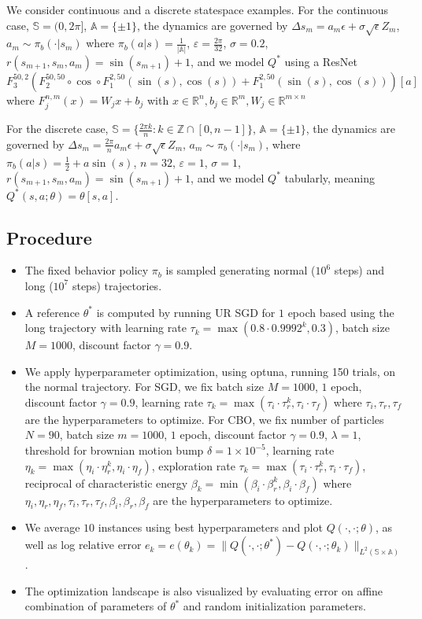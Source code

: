 \documentclass[10.5pt]{article}
\newcommand\bb{\mathbb}
\begin{document}
We consider continuous and a discrete statespace examples. For the continuous case, $\bb S = (0, 2\pi]$, $\bb A = \{\pm 1\}$, the dynamics are governed by $\Delta s_{m} = a_m\epsilon + \sigma \sqrt{\epsilon} Z_m$, $a_m\sim \pi_b(\cdot|s_m)$
  where $\pi_b(a|s)=\tfrac{1}{|\mathbb A|}$, $\varepsilon = \tfrac{2\pi}{32}$, $\sigma = 0.2$, $r(s_{m+1},s_{m},a_m) = \sin(s_{m+1})+1$, and we model $Q^*$ using a ResNet
$$
F_3^{50,2}\left(F_2^{50,50}\circ \cos\circ F_1^{2,50}(\sin(s),\cos(s)) + F_1^{2,50}(\sin(s),\cos(s))\right)[a]
$$
where $F_j^{n,m}(x)=W_j x + b_j$ with $x\in \bb R^n, b_j\in \bb R^m, W_j\in \bb R^{m\times n}$

For the discrete case, $\bb S = \{\tfrac{2\pi k }{n}: k\in \mathbb Z \cap [0,n-1]\}$, $\bb A = \{\pm 1\}$, the dynamics are governed by $\Delta s_{m} = \tfrac{2\pi}{n}a_m\epsilon + \sigma \sqrt{\epsilon} Z_m$, $a_m\sim \pi_b(\cdot|s_m)$, where $\pi_b(a|s)=\tfrac{1}{2}+ a\sin(s)$, $n=32$, $\varepsilon=1$, $\sigma=1$, $r(s_{m+1},s_{m},a_m) = \sin(s_{m+1})+1$, and we model $Q^*$ tabularly, meaning $Q^*(s,a;\theta)= \theta[s,a]$.

\subsection{Procedure}
\begin{itemize}
    \item
      The fixed behavior policy $\pi_b$ is sampled generating normal
      ($10^6$ steps) and long ($10^7$ steps) trajectories.
    \item
      A reference $\theta^*$ is computed by running UR SGD for $1$ epoch based using the long trajectory with learning rate $\tau_k=\max(0.8\cdot 0.9992^k, 0.3)$, batch size $M=1000$, discount factor $\gamma=0.9$.
    \item
      We apply hyperparameter optimization, using optuna, running 150 trials, on the normal trajectory. For SGD, we fix batch size $M=1000$, $1$ epoch, discount factor $\gamma=0.9$, learning rate $\tau_k = \max(\tau_i\cdot \tau_r^k, \tau_i\cdot\tau_f)$ where $\tau_i,\tau_r,\tau_f$ are the hyperparameters to optimize. For CBO, we fix number of particles $N=90$, batch size $m=1000$, $1$ epoch, discount factor $\gamma=0.9$, $\lambda=1$, threshold for brownian motion bump $\delta = 1\times 10^{-5}$,  learning rate $\eta_k = \max(\eta_i\cdot \eta_r^k,\eta_i\cdot \eta_f)$,  exploration rate $\tau_k =  \max(\tau_i\cdot \tau_r^k,\tau_i\cdot\tau_f)$, reciprocal of characteristic energy $\beta_k =  \min(\beta_i\cdot \beta_r^k,\beta_i\cdot \beta_f)$ where $\eta_i,\eta_r,\eta_f,\tau_i,\tau_r,\tau_f,\beta_i,\beta_r,\beta_f$ are the hyperparameters to optimize.
    \item
      We average $10$ instances using best hyperparameters and plot $Q(\cdot,\cdot;\theta)$, as well as log relative error
      $e_k=e(\theta_k)=\|Q(\cdot, \cdot;\theta^*)-Q(\cdot, \cdot;\theta_k)\|_{L^2(\bb S\times \bb A)}$.
    \item
      The optimization landscape is also visualized by evaluating error on affine combination of parameters of $\theta^*$ and random initialization parameters.
 \end{itemize}
\end{document}
